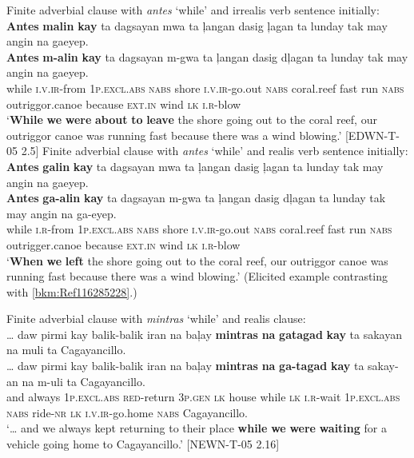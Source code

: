 \ea
\label{bkm:Ref116285228}
Finite adverbial clause with \textit{antes} ‘while’ and irrealis verb sentence initially:  \\
\textbf{Antes}  \textbf{malin}  \textbf{kay}  ta  dagsayan  mwa  ta  ļangan dasig  ļagan  ta  lunday  tak  may  angin  na  gaeyep. \smallskip\\
\gll \textbf{Antes}  \textbf{m-alin}  \textbf{kay}  ta  dagsayan  m-gwa  ta  ļangan dasig  dļagan  ta  lunday  tak  may  angin  na  gaeyep. \\
while  \textsc{i.v.ir}-from  1\textsc{p.excl.abs}  \textsc{nabs}  shore  \textsc{i.v.ir}-go.out  \textsc{nabs}  coral.reef
fast  run  \textsc{nabs}  outriggor.canoe  because  \textsc{ext.in}  wind  \textsc{lk}  \textsc{i.r}-blow \\
\glt `\textbf{While} \textbf{we} \textbf{were} \textbf{about} \textbf{to} \textbf{leave} the shore going out to the coral reef, our outriggor canoe was running fast because there was a wind blowing.’ [EDWN-T-05 2.5]
\z
\ea
Finite adverbial clause with \textit{antes} ‘while’ and realis verb sentence initially: \\
\textbf{Antes}  \textbf{galin}  \textbf{kay}  ta  dagsayan  mwa  ta  ļangan dasig  ļagan  ta  lunday  tak  may  angin  na  gaeyep. \smallskip\\
\gll \textbf{Antes}  \textbf{ga-alin}  \textbf{kay}  ta  dagsayan  m-gwa  ta  ļangan dasig  dļagan  ta  lunday  tak  may  angin  na  ga-eyep. \\
while  \textsc{i.r}-from  1\textsc{p.excl.abs}  \textsc{nabs}  shore  \textsc{i.v.ir}-go.out  \textsc{nabs}  coral.reef
fast  run  \textsc{nabs}  outrigger.canoe  because  \textsc{ext.in}  wind  \textsc{lk}  \textsc{i.r}-blow \\
\glt `\textbf{When} \textbf{we} \textbf{left} the shore going out to the coral reef, our outriggor canoe was running fast because there was a wind blowing.’ (Elicited example contrasting with \ref{bkm:Ref116285228}.)
\z

\ea
Finite adverbial clause with \textit{mintras} ‘while’ and realis clause: \\
… daw  pirmi  kay  balik-balik  iran  na  baļay  \textbf{mintras}  \textbf{na} \textbf{gatagad}  \textbf{kay}  ta  sakayan  na  muli  ta  Cagayancillo. \smallskip\\
\gll … daw  pirmi  kay  balik-balik  iran  na  baļay  \textbf{mintras}  \textbf{na} \textbf{ga-tagad} \textbf{kay}  ta  sakay-an  na  m-uli  ta  Cagayancillo. \\
{} and  always  1\textsc{p.excl.abs}  \textsc{red}-return  3\textsc{p.gen}  \textsc{lk}  house  while  \textsc{lk}
\textsc{i.r}-wait  1\textsc{p.excl.abs}  \textsc{nabs}  ride-\textsc{nr}  \textsc{lk}  \textsc{i.v.ir}-go.home  \textsc{nabs}  Cagayancillo. \\
\glt `… and we always kept returning to their place \textbf{while} \textbf{we} \textbf{were} \textbf{waiting} for a vehicle going home to Cagayancillo.’ [NEWN-T-05 2.16]
\z

